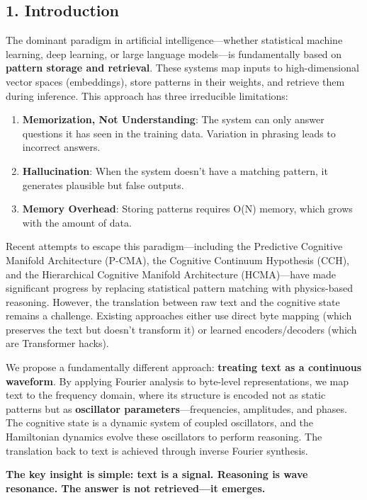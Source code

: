 \documentclass[
  11pt,
  a4paper,
]{article}
\providecommand{\tightlist}{%
  \setlength{\itemsep}{0pt}\setlength{\parskip}{0pt}}
\begin{document}
\subsection{1. Introduction}\label{introduction}

The dominant paradigm in artificial intelligence---whether statistical
machine learning, deep learning, or large language models---is
fundamentally based on \textbf{pattern storage and retrieval}. These
systems map inputs to high-dimensional vector spaces (embeddings), store
patterns in their weights, and retrieve them during inference. This
approach has three irreducible limitations:

\begin{enumerate}
\def\labelenumi{\arabic{enumi}.}
\tightlist
\item
  \textbf{Memorization, Not Understanding}: The system can only answer
  questions it has seen in the training data. Variation in phrasing
  leads to incorrect answers.
\item
  \textbf{Hallucination}: When the system doesn't have a matching
  pattern, it generates plausible but false outputs.
\item
  \textbf{Memory Overhead}: Storing patterns requires O(N) memory, which
  grows with the amount of data.
\end{enumerate}

Recent attempts to escape this paradigm---including the Predictive
Cognitive Manifold Architecture (P-CMA), the Cognitive Continuum
Hypothesis (CCH), and the Hierarchical Cognitive Manifold Architecture
(HCMA)---have made significant progress by replacing statistical pattern
matching with physics-based reasoning. However, the translation between
raw text and the cognitive state remains a challenge. Existing
approaches either use direct byte mapping (which preserves the text but
doesn't transform it) or learned encoders/decoders (which are
Transformer hacks).

We propose a fundamentally different approach: \textbf{treating text as
a continuous waveform}. By applying Fourier analysis to byte-level
representations, we map text to the frequency domain, where its
structure is encoded not as static patterns but as \textbf{oscillator
parameters}---frequencies, amplitudes, and phases. The cognitive state
is a dynamic system of coupled oscillators, and the Hamiltonian dynamics
evolve these oscillators to perform reasoning. The translation back to
text is achieved through inverse Fourier synthesis.

\textbf{The key insight is simple: text is a signal. Reasoning is wave
resonance. The answer is not retrieved---it emerges.}
\end{document}
